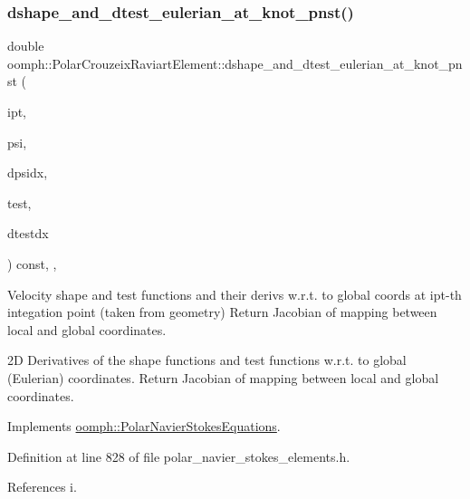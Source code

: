 \subsubsection{\texorpdfstring{dshape\+\_\+and\+\_\+dtest\+\_\+eulerian\+\_\+at\+\_\+knot\+\_\+pnst()}{dshape\_and\_dtest\_eulerian\_at\_knot\_pnst()}}
{\footnotesize\ttfamily double oomph\+::\+Polar\+Crouzeix\+Raviart\+Element\+::dshape\+\_\+and\+\_\+dtest\+\_\+eulerian\+\_\+at\+\_\+knot\+\_\+pnst (\begin{DoxyParamCaption}\item[{const unsigned \&}]{ipt,  }\item[{\hyperlink{classoomph_1_1Shape}{Shape} \&}]{psi,  }\item[{\hyperlink{classoomph_1_1DShape}{D\+Shape} \&}]{dpsidx,  }\item[{\hyperlink{classoomph_1_1Shape}{Shape} \&}]{test,  }\item[{\hyperlink{classoomph_1_1DShape}{D\+Shape} \&}]{dtestdx }\end{DoxyParamCaption}) const\hspace{0.3cm}{\ttfamily [inline]}, {\ttfamily [protected]}, {\ttfamily [virtual]}}



Velocity shape and test functions and their derivs w.\+r.\+t. to global coords at ipt-\/th integation point (taken from geometry) Return Jacobian of mapping between local and global coordinates. 

2D Derivatives of the shape functions and test functions w.\+r.\+t. to global (Eulerian) coordinates. Return Jacobian of mapping between local and global coordinates. 

Implements \hyperlink{classoomph_1_1PolarNavierStokesEquations_a7fda7aac0b9eb09410dfff38f992374c}{oomph\+::\+Polar\+Navier\+Stokes\+Equations}.



Definition at line 828 of file polar\+\_\+navier\+\_\+stokes\+\_\+elements.\+h.



References i.

\mbox{\label{classoomph_1_1PolarCrouzeixRaviartElement_acd23331a698b1dc87c9d309ed805430a}} 
